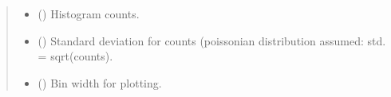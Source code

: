 \documentclass[letterpaper,10pt,english]{sphinxmanual}
\begin{document}
\begin{fulllineitems}
\begin{quote}
\begin{description}
\begin{itemize}
\item {} 
\sphinxAtStartPar
{} () \textendash{} Histogram counts.

\item {} 
\sphinxAtStartPar
{} () \textendash{} Standard deviation for counts
(poissonian distribution assumed: std. = sqrt(counts).

\item {} 
\sphinxAtStartPar
{} () \textendash{} Bin width for plotting.

\end{itemize}


\end{description}\end{quote}

\end{fulllineitems}

\end{document}

